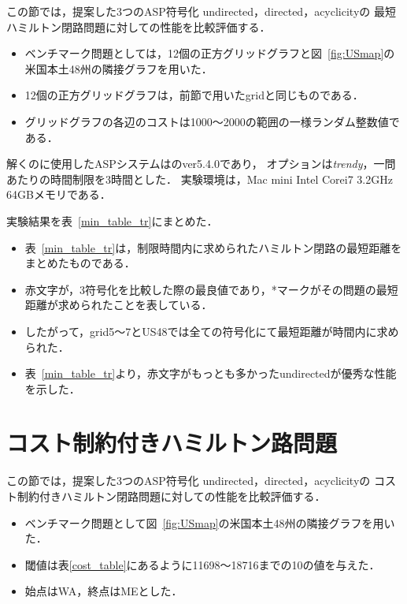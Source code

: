 この節では，提案した3つのASP符号化
\textsf{undirected}，\textsf{directed}，\textsf{acyclicity}の
最短ハミルトン閉路問題に対しての性能を比較評価する．

\begin{itemize}
\item ベンチマーク問題としては，12個の正方グリッドグラフと図~\ref{fig:USmap}の米国本土48州の隣接グラフを用いた．
\item 12個の正方グリッドグラフは，前節で用いたgridと同じものである．
\item グリッドグラフの各辺のコストは1000〜2000の範囲の一様ランダム整数値である．
\end{itemize}

解くのに使用したASPシステムは{\clingo}のver5.4.0であり，
オプションは\textit{trendy}，一問あたりの時間制限を3時間とした．
実験環境は，Mac mini Intel Corei7 3.2GHz 64GBメモリである．

実験結果を表~\ref{min_table_tr}にまとめた．

\begin{itemize}
\item 表~\ref{min_table_tr}は，制限時間内に求められたハミルトン閉路の最短距離をまとめたものである．
\item 赤文字が，3符号化を比較した際の最良値であり，*マークがその問題の最短距離が求められたことを表している．
\item したがって，grid5〜7とUS48では全ての符号化にて最短距離が時間内に求められた．
\item 表~\ref{min_table_tr}より，赤文字がもっとも多かった\textsf{undirected}が優秀な性能を示した．
\end{itemize}

\section{コスト制約付きハミルトン路問題}


この節では，提案した3つのASP符号化
\textsf{undirected}，\textsf{directed}，\textsf{acyclicity}の
コスト制約付きハミルトン閉路問題に対しての性能を比較評価する．

\begin{itemize}
\item ベンチマーク問題として図~\ref{fig:USmap}の米国本土48州の隣接グラフを用いた．
\item 閾値は表\ref{cost_table}にあるように11698〜18716までの10の値を与えた．
\item 始点はWA，終点はMEとした．
\end{itemize}


